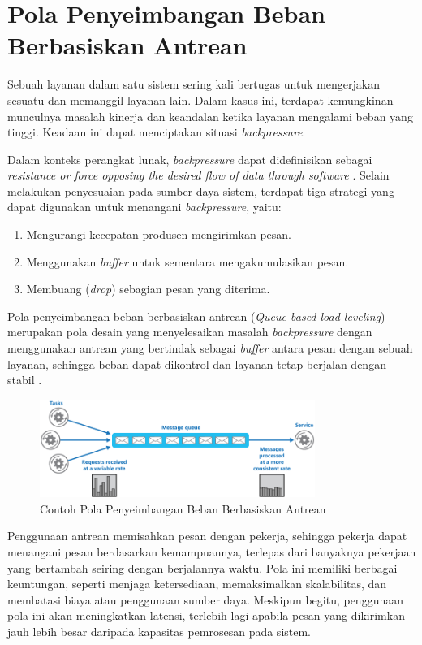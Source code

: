 \section{Pola Penyeimbangan Beban Berbasiskan Antrean}

Sebuah layanan dalam satu sistem sering kali bertugas untuk mengerjakan sesuatu dan memanggil layanan lain. Dalam kasus ini, terdapat kemungkinan munculnya masalah kinerja dan keandalan ketika layanan mengalami beban yang tinggi. Keadaan ini dapat menciptakan situasi \textit{backpressure}.

Dalam konteks perangkat lunak, \textit{backpressure} dapat didefinisikan sebagai \textit{resistance or force opposing the desired flow of data through software} \parencite{backpressureExplained}. Selain melakukan penyesuaian pada sumber daya sistem, terdapat tiga strategi yang dapat digunakan untuk menangani \textit{backpressure}, yaitu:

\begin{enumerate}
    \item Mengurangi kecepatan produsen mengirimkan pesan.
    \item Menggunakan \textit{buffer} untuk sementara mengakumulasikan pesan.
    \item Membuang (\textit{drop}) sebagian pesan yang diterima.
\end{enumerate}

Pola penyeimbangan beban berbasiskan antrean (\textit{Queue-based load leveling}) merupakan pola desain yang menyelesaikan masalah \textit{backpressure} dengan menggunakan antrean yang bertindak sebagai \textit{buffer} antara pesan dengan sebuah layanan, sehingga beban dapat dikontrol dan layanan tetap berjalan dengan stabil \parencite{queueLoadLeveling}.

\begin{figure}[htbp]
    \centering
    \includegraphics[width=0.8\textwidth]{resources/chapter-2/queue-based-load-leveling-pattern.png}
    \caption{Contoh Pola Penyeimbangan Beban Berbasiskan Antrean \parencite{queueLoadLeveling}}
    \label{fig:queue-based-load-leveling-pattern}
\end{figure}

Penggunaan antrean memisahkan pesan dengan pekerja, sehingga pekerja dapat menangani pesan berdasarkan kemampuannya, terlepas dari banyaknya pekerjaan yang bertambah seiring dengan berjalannya waktu. Pola ini memiliki berbagai keuntungan, seperti menjaga ketersediaan, memaksimalkan skalabilitas, dan membatasi biaya atau penggunaan sumber daya. Meskipun begitu, penggunaan pola ini akan meningkatkan latensi, terlebih lagi apabila pesan yang dikirimkan jauh lebih besar daripada kapasitas pemrosesan pada sistem.